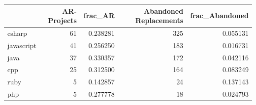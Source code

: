 \begin{tabular}{lrrrr}
\toprule
 & AR-Projects & frac_AR & Abandoned Replacements & frac_Abandoned \\
\midrule
csharp & 61 & 0.238281 & 325 & 0.055131 \\
javascript & 41 & 0.256250 & 183 & 0.016731 \\
java & 37 & 0.330357 & 172 & 0.042116 \\
cpp & 25 & 0.312500 & 164 & 0.083249 \\
ruby & 5 & 0.142857 & 24 & 0.137143 \\
php & 5 & 0.277778 & 18 & 0.024793 \\
\bottomrule
\end{tabular}
